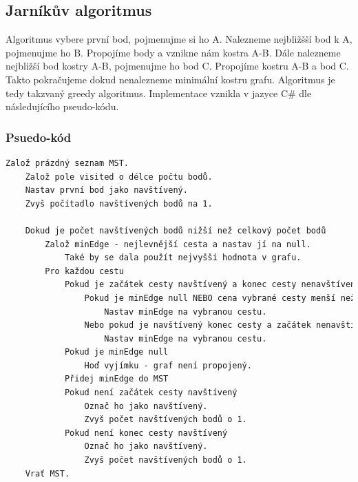 \documentclass[11pt]{article}
\begin{document}
\subsection{Jarníkův algoritmus}
Algoritmus vybere první bod, pojmenujme si ho A. Nalezneme nejbližšší bod k A, pojmenujme ho B. Propojíme body a vznikne nám kostra A-B. Dále nalezneme nejbližší bod kostry A-B, pojmenujme ho bod C. Propojíme kostru A-B a bod C. Takto pokračujeme dokud nenalezneme minimální kostru grafu.
Algoritmus je tedy takzvaný greedy algoritmus.
Implementace vznikla v jazyce C\# dle následujícího pseudo-kódu.

\subsubsection{Psuedo-kód}
\begin{lstlisting}[language=csh]
    Založ prázdný seznam MST.
    Založ pole visited o délce počtu bodů.
    Nastav první bod jako navštívený.
    Zvyš počítadlo navštívených bodů na 1.

    Dokud je počet navštívených bodů nižší než celkový počet bodů
        Založ minEdge - nejlevnější cesta a nastav jí na null.
            Také by se dala použít nejvyšší hodnota v grafu.
        Pro každou cestu
            Pokud je začátek cesty navštívený a konec cesty nenavštívený
                Pokud je minEdge null NEBO cena vybrané cesty menší než cena minEdge
                    Nastav minEdge na vybranou cestu.
                Nebo pokud je navštívený konec cesty a začátek nenavštívený
                    Nastav minEdge na vybranou cestu.
            Pokud je minEdge null
                Hoď vyjímku - graf není propojený.
            Přidej minEdge do MST
            Pokud není začátek cesty navštívený
                Označ ho jako navštívený.
                Zvyš počet navštívených bodů o 1.
            Pokud není konec cesty navštívený
                Označ ho jako navštívený.
                Zvyš počet navštívených bodů o 1.
    Vrať MST.
\end{lstlisting}    
\end{document}

